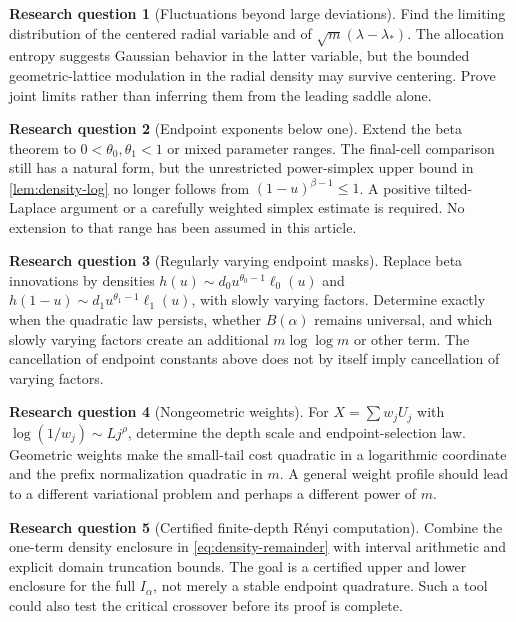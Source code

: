 \documentclass[11pt,a4paper]{article}
\numberwithin{equation}{section}
\theoremstyle{definition}\newaliascnt{definition}{theorem}
\newtheorem{problem}[problem]{Research question}
\theoremstyle{remark}\newaliascnt{remark}{theorem}
\begin{document}
\begin{problem}[Fluctuations beyond large deviations]
Find the limiting distribution of the centered radial variable and of
$\sqrt m(\lambda-\lambda_*)$. The allocation entropy suggests Gaussian
behavior in the latter variable, but the bounded geometric-lattice
modulation in the radial density may survive centering. Prove joint limits
rather than inferring them from the leading saddle alone.
\end{problem}

\begin{problem}[Endpoint exponents below one]
Extend the beta theorem to $0<\theta_0,\theta_1<1$ or mixed parameter
ranges. The final-cell comparison still has a natural form, but the
unrestricted power-simplex upper bound in \cref{lem:density-log} no longer
follows from $(1-u)^{\beta-1}\le1$. A positive tilted-Laplace argument or a
carefully weighted simplex estimate is required. No extension to that
range has been assumed in this article.
\end{problem}

\begin{problem}[Regularly varying endpoint masks]
Replace beta innovations by densities
$h(u)\sim d_0u^{\theta_0-1}\ell_0(u)$ and
$h(1-u)\sim d_1u^{\theta_1-1}\ell_1(u)$, with slowly varying factors.
Determine exactly when the quadratic law persists, whether $B(\alpha)$
remains universal, and which slowly varying factors create an additional
$m\log\log m$ or other term. The cancellation of endpoint constants above
does not by itself imply cancellation of varying factors.
\end{problem}

\begin{problem}[Nongeometric weights]
For $X=\sum w_jU_j$ with $\log(1/w_j)\sim Lj^\rho$, determine the depth
scale and endpoint-selection law. Geometric weights make the small-tail
cost quadratic in a logarithmic coordinate and the prefix normalization
quadratic in $m$. A general weight profile should lead to a different
variational problem and perhaps a different power of $m$.
\end{problem}

\begin{problem}[Certified finite-depth R\'enyi computation]
Combine the one-term density enclosure in \eqref{eq:density-remainder}
with interval arithmetic and explicit domain truncation bounds. The goal
is a certified upper and lower enclosure for the full $I_\alpha$, not
merely a stable endpoint quadrature. Such a tool could also test the
critical crossover before its proof is complete.
\end{problem}
\end{document}
